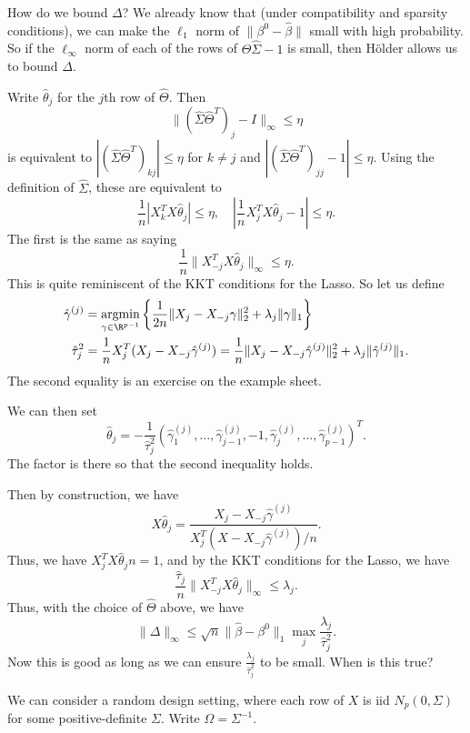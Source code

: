 \documentclass[a4paper]{article}
\DeclareMathOperator*\argmin{argmin}
\begin{document}
How do we bound $\Delta$? We already know that (under compatibility and sparsity conditions), we can make the $\ell_1$ norm of $\|\beta^0 - \hat{\beta}\|$ small with high probability. So if the $\ell_\infty$ norm of each of the rows of $\hat{\Theta} \hat{\Sigma} - 1$ is small, then H\"older allows us to bound $\Delta$.

Write $\hat{\theta}_j$ for the $j$th row of $\hat{\Theta}$. Then
\[
  \|(\hat{\Sigma} \hat{\Theta}^T)_j - I \|_\infty \leq \eta
\]
is equivalent to $|(\hat{\Sigma} \hat{\Theta}^T)_{kj}| \leq \eta$ for $k \not= j$ and $|(\hat{\Sigma} \hat{\Theta}^T)_{jj} - 1 | \leq \eta$. Using the definition of $\hat{\Sigma}$, these are equivalent to
\[
  \frac{1}{n}|X_k^T X \hat{\theta}_j| \leq \eta,\quad \left|\frac{1}{n} X^T_j X \hat{\theta}_j - 1 \right| \leq \eta.
\]
The first is the same as saying
\[
  \frac{1}{n} \|X_{-j}^T X \hat{\theta}_j\|_\infty \leq \eta.
\]
This is quite reminiscent of the KKT conditions for the Lasso. So let us define
\begin{align*}
  \hat{\gamma}^{(j)} &= \argmin_{\gamma \in \R^{p - 1}} \left\{\frac{1}{2n} \|X_j - X_{-j} \gamma\|_2^2 + \lambda_j \|\gamma\|_1\right\}\\
  \hat{\tau}_j^2 &= \frac{1}{n} X_j^T (X_j - X_{-j} \hat{\gamma}^{(j)}) = \frac{1}{n} \|X_j - X_{-j} \hat{\gamma}^{(j)}\|_2^2 + \lambda_j \|\hat{\gamma}^{(j)}\|_1.
\end{align*}
The second equality is an exercise on the example sheet.

We can then set
\[
  \hat{\theta}_j = -\frac{1}{\hat{\tau}_j^2} (\hat{\gamma}_1^{(j)}, \ldots, \hat{\gamma}_{j - 1}^{(j)}, -1, \hat{\gamma}_j^{(j)}, \ldots, \hat{\gamma}_{p - 1}^{(j)})^T.
\]
The factor is there so that the second inequality holds.

Then by construction, we have
\[
  X \hat{\theta}_j = \frac{X_j - X_{-j} \hat{\gamma}^{(j)}}{X^T_j(X - X_{-j} \hat{\gamma}^{(j)})/n}.
\]
Thus, we have $X_j^T X \hat{\theta}_j n = 1$, and by the KKT conditions for the Lasso, we have
\[
  \frac{\hat{\tau}_j}{n} \|X_{-j}^T X \hat{\theta}_j\|_{\infty} \leq \lambda_j.
\]
Thus, with the choice of $\hat{\Theta}$ above, we have
\[
  \|\Delta\|_{\infty} \leq \sqrt{n} \|\hat{\beta} - \beta^0\|_1 \max_j \frac{\lambda_j}{\hat{\tau}_j^2}.
\]
Now this is good as long as we can ensure $\frac{\lambda_j}{\hat{\tau}_j^2}$ to be small. When is this true?

We can consider a random design setting, where each row of $X$ is iid $N_p(0, \Sigma)$ for some positive-definite $\Sigma$. Write $\Omega = \Sigma^{-1}$.
\end{document}
